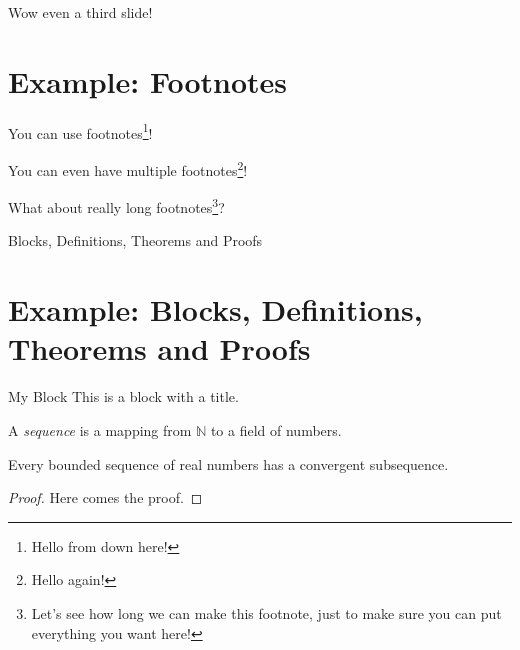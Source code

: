 \documentclass[aspectratio=169,17pt,institute=none]{tuhh_presentation}
\begin{document}
\begin{frame}{Wow even a third slide!}
    \section{Example: Footnotes}

    You can use footnotes\footnote{Hello from down here!}!

    You can even have multiple footnotes\footnote{Hello again!}!

    What about really long footnotes\footnote{Let's see how long we can make this footnote, just to make sure you can put everything you want here!}?
\end{frame}

\begin{frame}{Blocks, Definitions, Theorems and Proofs}
    \section{Example: Blocks, Definitions, Theorems and Proofs}

    \begin{block}{My Block}
      This is a block with a title.
    \end{block}

    \begin{definition}
      A \emph{sequence} is a mapping from $\mathbb{N}$ to a field of numbers.
    \end{definition}

    \begin{theorem}
      Every bounded sequence of real numbers has a convergent subsequence.
    \end{theorem}

    \begin{proof}
      Here comes the proof.
    \end{proof}
\end{frame}
\end{document}

